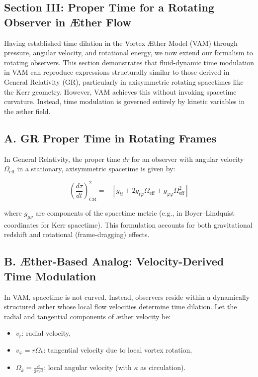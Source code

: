 \subsection*{Section III: Proper Time for a Rotating Observer in Æther Flow}

Having established time dilation in the Vortex Æther Model (VAM) through pressure, angular velocity, and rotational energy, we now extend our formalism to rotating observers. This section demonstrates that fluid-dynamic time modulation in VAM can reproduce expressions structurally similar to those derived in General Relativity (GR), particularly in axisymmetric rotating spacetimes like the Kerr geometry. However, VAM achieves this without invoking spacetime curvature. Instead, time modulation is governed entirely by kinetic variables in the æther field.

\subsection*{A. GR Proper Time in Rotating Frames}

In General Relativity, the proper time \(d\tau\) for an observer with angular velocity \(\Omega_{\text{eff}}\) in a stationary, axisymmetric spacetime is given by:

\begin{equation}
\left( \frac{d\tau}{dt} \right)^2_{\text{GR}} = -\left[ g_{tt} + 2g_{t\varphi} \Omega_{\text{eff}} + g_{\varphi\varphi} \Omega_{\text{eff}}^2 \right]
\tag{18}
\end{equation}

where \(g_{\mu\nu}\) are components of the spacetime metric (e.g., in Boyer–Lindquist coordinates for Kerr spacetime). This formulation accounts for both gravitational redshift and rotational (frame-dragging) effects.

\subsection*{B. Æther-Based Analog: Velocity-Derived Time Modulation}

In VAM, spacetime is not curved. Instead, observers reside within a dynamically structured æther whose local flow velocities determine time dilation. Let the radial and tangential components of æther velocity be:

\begin{itemize}
\item \(v_r\): radial velocity,
\item \(v_\varphi = r\Omega_k\): tangential velocity due to local vortex rotation,
\item \(\Omega_k = \frac{\kappa}{2\pi r^2}\): local angular velocity (with \(\kappa\) as circulation).
\end{itemize}

